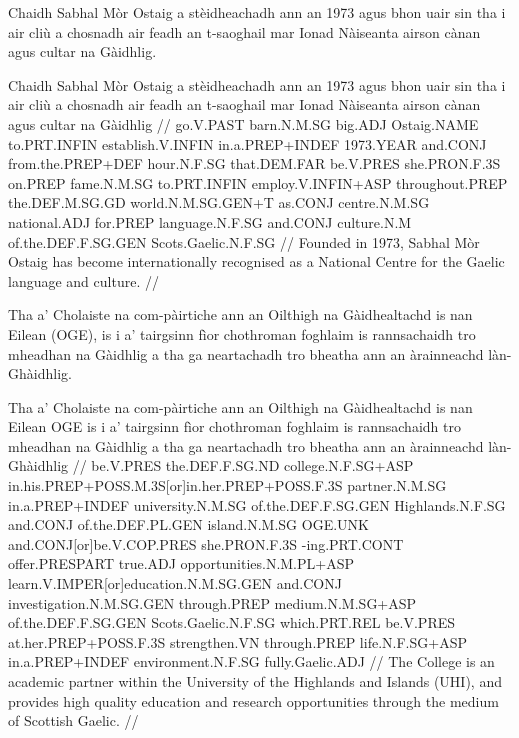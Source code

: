 \documentclass[a4paper,10pt]{article}
\title{\Large\headword{\color{mygreen}{A POS-tagged Gàidhlig Corpus}}}
\author{Bangor Autoglosser proof-of-concept}
\date{}
\begin{document}
\maketitle

\ex
\begingl
\glpre Chaidh Sabhal Mòr Ostaig a stèidheachadh ann an 1973 agus bhon uair sin tha i air cliù a chosnadh air feadh an t-saoghail mar Ionad Nàiseanta airson cànan agus cultar na Gàidhlig. 

\vspace{4mm}
\gla Chaidh Sabhal Mòr Ostaig a stèidheachadh {ann an} 1973 agus bhon uair sin tha i air cliù a chosnadh {air feadh} an t-saoghail mar Ionad Nàiseanta airson cànan agus cultar na Gàidhlig  //
\glb go.V.PAST barn.N.M.SG big.ADJ Ostaig.NAME to.PRT.INFIN establish.V.INFIN in.a.PREP+INDEF 1973.YEAR and.CONJ from.the.PREP+DEF hour.N.F.SG that.DEM.FAR be.V.PRES she.PRON.F.3S on.PREP fame.N.M.SG to.PRT.INFIN employ.V.INFIN+ASP throughout.PREP the.DEF.M.SG.GD world.N.M.SG.GEN+T as.CONJ centre.N.M.SG national.ADJ for.PREP language.N.F.SG and.CONJ culture.N.M of.the.DEF.F.SG.GEN Scots.Gaelic.N.F.SG  //
\glft Founded in 1973, Sabhal Mòr Ostaig has become internationally recognised as a National Centre for the Gaelic language and culture. //
\endgl
\xe

\ex
\begingl
\glpre Tha a' Cholaiste na com-pàirtiche ann an Oilthigh na Gàidhealtachd is nan Eilean (OGE), is i a' tairgsinn fìor chothroman foghlaim is rannsachaidh tro mheadhan na Gàidhlig a tha ga neartachadh tro bheatha ann an àrainneachd làn-Ghàidhlig. 

\vspace{4mm}
\gla Tha a' Cholaiste na com-pàirtiche {ann an} Oilthigh na Gàidhealtachd is nan Eilean OGE is i a' tairgsinn fìor chothroman foghlaim is rannsachaidh tro mheadhan na Gàidhlig a tha ga neartachadh tro bheatha {ann an} àrainneachd làn-Ghàidhlig  //
\glb be.V.PRES the.DEF.F.SG.ND college.N.F.SG+ASP in.his.PREP+POSS.M.3S[or]in.her.PREP+POSS.F.3S partner.N.M.SG in.a.PREP+INDEF university.N.M.SG of.the.DEF.F.SG.GEN Highlands.N.F.SG and.CONJ of.the.DEF.PL.GEN island.N.M.SG OGE.UNK and.CONJ[or]be.V.COP.PRES she.PRON.F.3S -ing.PRT.CONT offer.PRESPART true.ADJ opportunities.N.M.PL+ASP learn.V.IMPER[or]education.N.M.SG.GEN and.CONJ investigation.N.M.SG.GEN through.PREP medium.N.M.SG+ASP of.the.DEF.F.SG.GEN Scots.Gaelic.N.F.SG which.PRT.REL be.V.PRES at.her.PREP+POSS.F.3S strengthen.VN through.PREP life.N.F.SG+ASP in.a.PREP+INDEF environment.N.F.SG fully.Gaelic.ADJ  //
\glft The College is an academic partner within the University of the Highlands and Islands (UHI), and provides high quality education and research opportunities through the medium of Scottish Gaelic. //
\endgl
\xe
\end{document}
